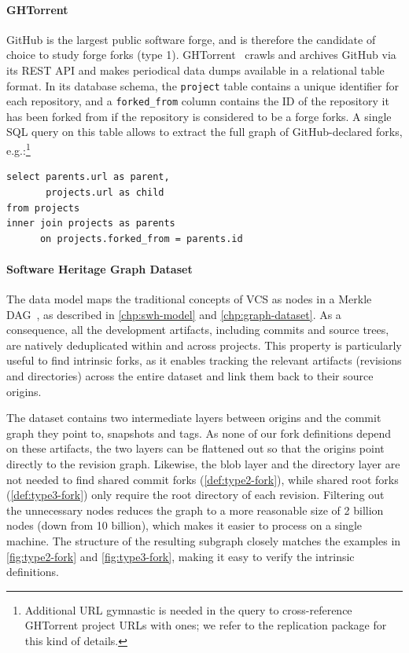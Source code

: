 \paragraph{GHTorrent}
GitHub is the largest public software forge, and is therefore the candidate of
choice to study forge forks (type 1). GHTorrent~\cite{GHTorrent} crawls and
archives GitHub via its REST API and makes periodical data dumps available in a
relational table format. In its database schema, the \texttt{project} table
contains a unique identifier for each repository, and a \texttt{forked\_from}
column contains the ID of the repository it has been forked from if the
repository is considered to be a forge forks.  A single SQL query on this table
allows to extract the full graph of GitHub-declared forks,
e.g.:\footnote{Additional URL gymnastic is needed in the query to
cross-reference GHTorrent project URLs with \SWH{} ones; we refer to the
replication package for this kind of details.}
\begin{verbatim}
select parents.url as parent,
       projects.url as child
from projects
inner join projects as parents
      on projects.forked_from = parents.id
\end{verbatim}

\paragraph{Software Heritage Graph Dataset}
The \SWHGD{} data model maps the traditional concepts of VCS as nodes in a Merkle
DAG~\cite{Merkle}, as described in \cref{chp:swh-model} and
\cref{chp:graph-dataset}. As a consequence, all the development artifacts,
including commits and source trees, are natively deduplicated within and across
projects. This property is particularly useful to find intrinsic forks, as it
enables tracking the relevant artifacts (revisions and directories) across the
entire dataset and link them back to their source origins.

The dataset contains two intermediate layers between origins and the
commit graph they point to, snapshots and tags. As none of our fork definitions
depend on these artifacts, the two layers can be flattened out so that the
origins point directly to the revision graph.  Likewise, the blob layer and the
directory layer are not needed to find shared commit forks
(\cref{def:type2-fork}), while shared root forks
(\cref{def:type3-fork}) only require the root directory of each
revision.  Filtering out the unnecessary nodes reduces the graph to a more
reasonable size of 2 billion nodes (down from 10 billion), which makes it
easier to process on a single machine. The structure of the resulting subgraph
closely matches the examples in \cref{fig:type2-fork} and
\cref{fig:type3-fork}, making it easy to verify the intrinsic definitions.

